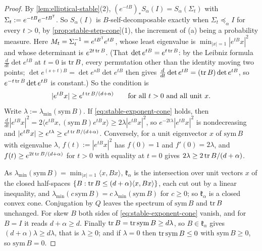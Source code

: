 \begin{proof}
\leanok
By \ref{lem:elliptical-stable}(2), $(e^{-tB})_*S_\alpha(I) = S_\alpha(\Sigma_t)$ with
$\Sigma_t := e^{-tB}e^{-tB^{\mathsf{T}}}$. So $S_\alpha(I)$ is $B$-self-decomposable exactly when
$\Sigma_t \preceq_\alpha I$ for every $t > 0$, by \ref{prop:stable-step-cone}(1), the increment of
(a) being a probability measure. Here $M_t = \Sigma_t^{-1} = e^{tB^{\mathsf{T}}}e^{tB}$, whose least eigenvalue
is $\min_{|x|=1}|e^{tB}x|^2$ and whose determinant is $e^{2t\operatorname{tr} B}$. (That
$\det e^{tB} = e^{t\operatorname{tr} B}$: by the Leibniz formula $\frac{d}{dt}\det e^{tB}$ at $t = 0$ is $\operatorname{tr} B$, every
permutation other than the identity moving two points; $\det e^{(s+t)B} = \det e^{sB}\det e^{tB}$
then gives $\frac{d}{dt}\det e^{tB} = (\operatorname{tr} B)\det e^{tB}$, so $e^{-t\operatorname{tr} B}\det e^{tB}$ is constant.)
So the condition is
\[
  |e^{tB}x| \ge e^{t\operatorname{tr} B/(d+\alpha)} \qquad \text{for all } t > 0 \text{ and all unit } x .
\]
Write $\lambda := \lambda_{\min}(\mathrm{sym}\,B)$. If \ref{eq:stable-exponent-cone} holds, then
$\tfrac{d}{dt}|e^{tB}x|^2 = 2\langle e^{tB}x,(\mathrm{sym}\,B)e^{tB}x\rangle \ge 2\lambda|e^{tB}x|^2$,
so $e^{-2t\lambda}|e^{tB}x|^2$ is nondecreasing and $|e^{tB}x| \ge e^{t\lambda} \ge
e^{t\operatorname{tr} B/(d+\alpha)}$. Conversely, for a unit eigenvector $x$ of $\mathrm{sym}\,B$ with eigenvalue
$\lambda$, $f(t) := |e^{tB}x|^2$ has $f(0) = 1$ and $f'(0) = 2\lambda$, and
$f(t) \ge e^{2t\operatorname{tr} B/(d+\alpha)}$ for $t > 0$ with equality at $t = 0$ gives
$2\lambda \ge 2\operatorname{tr} B/(d+\alpha)$.

As $\lambda_{\min}(\mathrm{sym}\,B) = \min_{|x|=1}\langle x,Bx\rangle$, $\mathfrak k_\alpha$ is the intersection
over unit vectors $x$ of the closed half-spaces $\{B : \operatorname{tr} B \le (d+\alpha)\langle x,Bx\rangle\}$, each
cut out by a linear inequality, and $\lambda_{\min}(c\,\mathrm{sym}\,B) = c\,\lambda_{\min}(\mathrm{sym}\,B)$
for $c \ge 0$; so $\mathfrak k_\alpha$ is a closed convex cone. Conjugation by
$Q$ leaves the spectrum of $\mathrm{sym}\,B$ and $\operatorname{tr} B$ unchanged. For skew $B$ both sides of
\ref{eq:stable-exponent-cone} vanish, and for $B = I$ it reads $d + \alpha \ge d$. Finally
$\operatorname{tr} B = \operatorname{tr}\mathrm{sym}\,B \ge d\lambda$, so $B \in \mathfrak k_\alpha$ gives $(d+\alpha)\lambda \ge d\lambda$, that
is $\lambda \ge 0$; and if $\lambda = 0$ then $\operatorname{tr}\mathrm{sym}\,B \le 0$ with $\mathrm{sym}\,B \ge 0$,
so $\mathrm{sym}\,B = 0$.
\end{proof}

